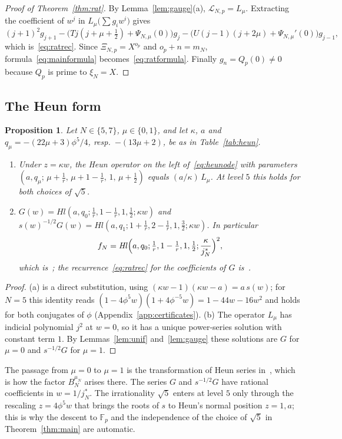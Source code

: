 \documentclass[11pt,a4paper]{article}
\newtheorem{proposition}[theorem]{Proposition}
\theoremstyle{definition}
\theoremstyle{remark}
\newcommand{\F}{\mathbb{F}}
\newcommand{\Hl}{\mathit{Hl}}
\newcommand{\cL}{\mathcal{L}}
\numberwithin{equation}{section}
\begin{document}
\begin{proof}[Proof of Theorem~\ref{thm:rat}]
By Lemma~\ref{lem:gauge}(a), $\cL_{N,p}=L_\mu$. Extracting the coefficient of
$w^j$ in $L_\mu\bigl(\sum g_iw^i\bigr)$ gives
\[
(j+1)^2g_{j+1}-\bigl(Tj(j+\mu+\tfrac12)+\Psi_{N,\mu}(0)\bigr)g_j
-\bigl(U(j-1)(j+2\mu)+\Psi_{N,\mu}'(0)\bigr)g_{j-1},
\]
which is~\eqref{eq:ratrec}. Since $\Xi_{N,p}=X^{o_p}$ and $o_p+n=m_N$,
formula~\eqref{eq:mainformula} becomes~\eqref{eq:ratformula}. Finally
$g_n=Q_p(0)\ne0$ because $Q_p$ is prime to $\xi_N=X$.
\end{proof}

\subsection{The Heun form}

\begin{proposition}\label{prop:heun}
Let $N\in\{5,7\}$, $\mu\in\{0,1\}$, and let $\kappa$, $a$ and
$q_\mu=-(22\mu+3)\phi^5/4$, resp.\ $-(13\mu+2)$, be as in
Table~\ref{tab:heun}.
\begin{enumerate}
\item[(a)] Under $z=\kappa w$, the Heun operator on the left
of~\eqref{eq:heunode} with parameters
$(a,q_\mu;\,\mu+\frac1r,\,\mu+1-\frac1r,\,1,\,\mu+\frac12)$ equals
$(a/\kappa)\,L_\mu$. At level $5$ this holds for both choices of $\sqrt5$.
\item[(b)] $G(w)=\Hl(a,q_0;\frac1r,1-\frac1r,1,\frac12;\kappa w)$ and
$s(w)^{-1/2}G(w)=\Hl(a,q_1;1+\frac1r,2-\frac1r,1,\frac32;\kappa w)$. In
particular
\[
f_N=\Hl\Bigl(a,q_0;\tfrac1r,1-\tfrac1r,1,\tfrac12;\frac{\kappa}{j_N^*}\Bigr)^2,
\]
which is~\cite[Proposition~3.1]{Sakai14}; the recurrence~\eqref{eq:ratrec}
for the coefficients of $G$ is~\cite[Lemma~3.3]{Sakai14}.
\end{enumerate}
\end{proposition}
\begin{proof}
(a) is a direct substitution, using $(\kappa w-1)(\kappa w-a)=a\,s(w)$; for
$N=5$ this identity reads
$(1-4\phi^5w)(1+4\phi^{-5}w)=1-44w-16w^2$ and holds for both conjugates of
$\phi$ (Appendix~\ref{app:certificates}). (b) The operator $L_\mu$ has
indicial polynomial $j^2$ at $w=0$, so it has a unique power-series solution
with constant term $1$. By Lemmas~\ref{lem:unif} and~\ref{lem:gauge} these
solutions are $G$ for $\mu=0$ and $s^{-1/2}G$ for $\mu=1$.
\end{proof}

The passage from $\mu=0$ to $\mu=1$ is the transformation of Heun series
in~\cite[eq.~(24)]{Nakaya19}, which is how the factor $B_N^{\mu_N}$ arises
there. The series $G$ and $s^{-1/2}G$ have rational coefficients in
$w=1/j_N^*$. The irrationality $\sqrt5$ enters at level $5$ only through the
rescaling $z=4\phi^5w$ that brings the roots of $s$ to Heun's normal position
$z=1,a$; this is why the descent to $\F_p$ and the independence of the choice
of $\sqrt5$ in Theorem~\ref{thm:main} are automatic.
\end{document}
